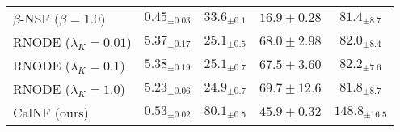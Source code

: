\begin{table}[htb]
\begin{center}
\begin{small}
\begin{sc}
\begin{tabular}{lcccc}
                    $\beta$-NSF ($\beta = 1.0$)  & $\mathbf{0.45}_{\pm 0.03}$  & $33.6_{\pm 0.1}$                                 & $\mathbf{16.9} \pm 0.28$   & $\mathbf{81.4}_{\pm 8.7}$                        \\ %
                    RNODE ($\lambda_K = 0.01$)   & $5.37_{\pm 0.17}$           & $\mathbf{25.1}_{\pm 0.5}$                        & $68.0 \pm 2.98$            & $\mathbf{82.0}_{\pm 8.4}$                        \\ %
                    RNODE ($\lambda_K = 0.1$)    & $5.38_{\pm 0.19}$           & $\mathbf{25.1}_{\pm 0.7}$                        & $67.5 \pm 3.60$            & $\mathbf{82.2}_{\pm 7.6}$                        \\ %
                    RNODE ($\lambda_K = 1.0$)    & $5.23_{\pm 0.06}$           & $\mathbf{24.9}_{\pm 0.7}$                        & $69.7 \pm 12.6$            & $\mathbf{81.8}_{\pm 8.7}$                        \\ %
                    CalNF (ours)                 & $0.53_{\pm 0.02}$           & $80.1_{\pm 0.5}$                                 & $45.9 \pm 0.32$            & $148.8_{\pm 16.5}$                               \\ %
                    \bottomrule
                \end{tabular}
            \end{sc}
        \end{small}
    \end{center}
\end{table}